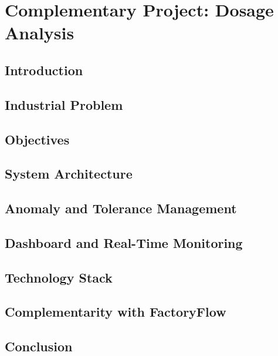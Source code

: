 \chapter{Complementary Project: Dosage Analysis}

\section{Introduction}

\section{Industrial Problem}

\section{Objectives}

\section{System Architecture}

\section{Anomaly and Tolerance Management}

\section{Dashboard and Real-Time Monitoring}

\section{Technology Stack}

\section{Complementarity with FactoryFlow}

\section{Conclusion}